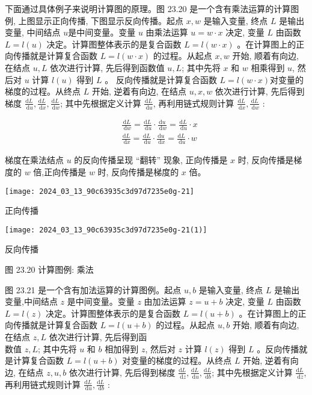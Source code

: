 \documentclass[10pt]{article}
\begin{document}
\begin{CJK*}{UTF8}{bsmi}
下面通过具体例子来说明计算图的原理。图 23.20 是一个含有乘法运算的计算图例, 上图显示正向传播, 下图显示反向传播。起点 $x, w$ 是输入变量, 终点 $L$ 是输出变量, 中间结点 $u$是中间变量。变量 $u$ 由乘法运算 $u=w \cdot x$ 决定, 变量 $L$ 由函数 $L=l(u)$ 决定。计算图整体表示的是复合函数 $L=l(w \cdot x)$ 。在计算图上的正向传播就是计算复合函数 $L=l(w \cdot x)$ 的过程。从起点 $x, w$ 开始, 顺着有向边, 在结点 $u, L$ 依次进行计算, 先后得到函数值 $u, L$; 其中先将 $x$ 和 $w$ 相乘得到 $u$, 然后对 $u$ 计算 $l(u)$ 得到 $L$ 。 反向传播就是计算复合函数 $L=l(w \cdot x)$对变量的梯度的过程。从终点 $L$ 开始, 逆着有向边, 在结点 $u, x, w$ 依次进行计算, 先后得到梯度 $\frac{\mathrm{d} L}{\mathrm{~d} u}, \frac{\mathrm{d} L}{\mathrm{~d} x}, \frac{\mathrm{d} L}{\mathrm{~d} w}$; 其中先根据定义计算 $\frac{\mathrm{d} L}{\mathrm{~d} u}$, 再利用链式规则计算 $\frac{\mathrm{d} L}{\mathrm{~d} x}, \frac{\mathrm{d} L}{\mathrm{~d} w}$ :

$$
\begin{aligned}
& \frac{\mathrm{d} L}{\mathrm{~d} w}=\frac{\mathrm{d} L}{\mathrm{~d} u} \cdot \frac{\mathrm{d} u}{\mathrm{~d} w}=\frac{\mathrm{d} L}{\mathrm{~d} u} \cdot x \\
& \frac{\mathrm{d} L}{\mathrm{~d} x}=\frac{\mathrm{d} L}{\mathrm{~d} u} \cdot \frac{\mathrm{d} u}{\mathrm{~d} x}=\frac{\mathrm{d} L}{\mathrm{~d} u} \cdot w
\end{aligned}
$$

梯度在乘法结点 $u$ 的反向传播呈现 “翻转” 现象, 正向传播是 $x$ 时, 反向传播是梯度的 $w$ 倍,正向传播是 $w$ 时, 反向传播是梯度的 $x$ 倍。

\begin{center}
\texttt{[image: 2024\_03\_13\_90c63935c3d97d7235e0g-21]}
\end{center}

正向传播

\begin{center}
\texttt{[image: 2024\_03\_13\_90c63935c3d97d7235e0g-21(1)]}
\end{center}

反向传播

图 23.20 计算图例: 乘法

图 23.21 是一个含有加法运算的计算图例。起点 $u, b$ 是输入变量, 终点 $L$ 是输出变量,中间结点 $z$ 是中间变量。变量 $z$ 由加法运算 $z=u+b$ 决定, 变量 $L$ 由函数 $L=l(z)$ 决定。计算图整体表示的是复合函数 $L=l(u+b)$ 。在计算图上的正向传播就是计算复合函数 $L=l(u+b)$ 的过程。从起点 $u, b$ 开始, 顺着有向边, 在结点 $z, L$ 依次进行计算, 先后得到函\\
数值 $z, L$; 其中先将 $u$ 和 $b$ 相加得到 $z$, 然后对 $z$ 计算 $l(z)$ 得到 $L$ 。反向传播就是计算复合函数 $L=l(u+b)$ 对变量的梯度的过程。从终点 $L$ 开始, 逆着有向边, 在结点 $z, u, b$ 依次进行计算, 先后得到梯度 $\frac{\mathrm{d} L}{\mathrm{~d} z}, \frac{\mathrm{d} L}{\mathrm{~d} u}, \frac{\mathrm{d} L}{\mathrm{~d} b}$; 其中先根据定义计算 $\frac{\mathrm{d} L}{\mathrm{~d} z}$, 再利用链式规则计算 $\frac{\mathrm{d} L}{\mathrm{~d} u}, \frac{\mathrm{d} L}{\mathrm{~d} b}$ :


\end{CJK*}
\end{document}

